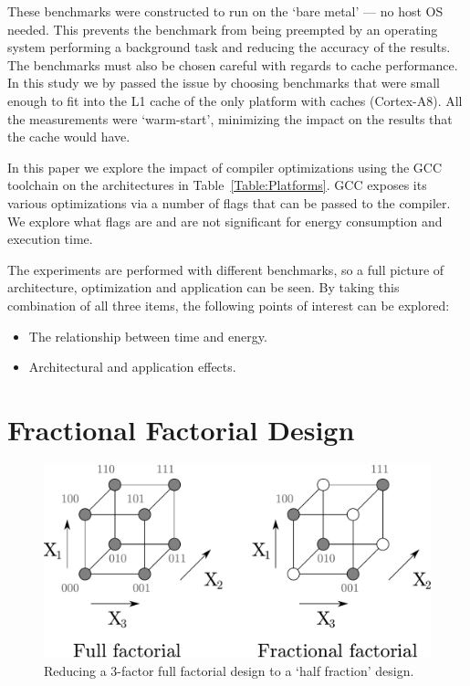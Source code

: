 \documentclass[twocolumn]{article}
\let\oldcaption\caption
\renewcommand{\caption}[1]{\oldcaption{\textup{#1}}}
\begin{document}
These benchmarks were constructed to run on the `bare metal' --- no host OS needed. This prevents the benchmark from being preempted by an operating system performing a background task and reducing the accuracy of the results. The benchmarks must also be chosen careful with regards to cache performance. In this study we by passed the issue by choosing benchmarks that were small enough to fit into the L1 cache of the only platform with caches (Cortex-A8). All the measurements were `warm-start', minimizing the impact on the results that the cache would have.

In this paper we explore the impact of compiler optimizations using the GCC toolchain on the architectures in Table~\ref{Table:Platforms}. GCC exposes its various optimizations via a number of flags that can be passed to the compiler. We explore what flags are and are not significant for energy consumption and execution time.

The experiments are performed with different benchmarks, so a full picture of architecture, optimization and application can be seen. By taking this combination of all three items, the following points of interest can be explored:
\begin{itemize}
	\setlength{\itemsep}{0em}
	\vspace{-1mm}
 	\item The relationship between time and energy.
 	\item Architectural and application effects.
 \end{itemize}

\section{Fractional Factorial Design}

\begin{figure}[bt]
	\centering
	\includegraphics[width=0.9\linewidth]{ffd.pdf}
	\caption{Reducing a 3-factor full factorial design to a `half fraction' design.}
	\label{Fig:FFDTut}
\end{figure}
\end{document}
